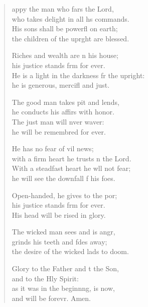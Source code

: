 \begin{verse}
  \begin{patverse}
appy the man who fars the Lord,\Med\\
who takes delight in all h\pointup{\i}s commands.\\
His sons shall be powerfl on earth;\Med\\
the children of the upr\pointup{\i}ght are blessed.

Riches and wealth are \pointup{\i}n his house;\Med\\
his justice stands f\pointup{\i}rm for ever.\\
He is a light in the darkness fr the upright:\Med\\
he is generous, mercifl and just.

The good man takes pit and lends,\Med\\
he conducts his affirs with honor.\\
The just man will nver waver:\Med\\
he will be remembred for ever.

He has no fear of vil news;\Med\\
with a firm heart he trusts \pointup{\i}n the Lord.\\
With a steadfast heart he w\pointup{\i}ll not fear;\Med\\
he will see the downfall f his foes.

Open-handed, he gives to the por;\Flex\\
his justice stands f\pointup{\i}rm for ever.\Med\\
His head will be rised in glory.

The wicked man sees and is angr,\Flex\\
grinds his teeth and fdes away;\Med\\
the desire of the wicked lads to doom.

Glory to the Father and t the Son,\Med\\
and to the Hly Spirit:\\
as it was in the beginn\pointup{\i}ng, is now,\Med\\
and will be forevr. Amen. 
  \end{patverse}
\end{verse}
